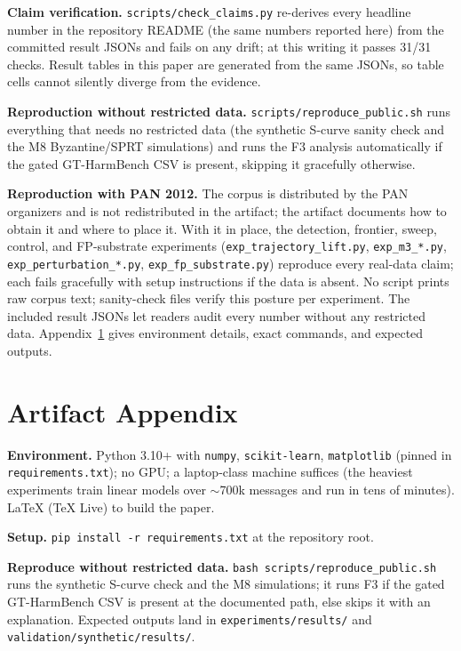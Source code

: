 \documentclass[letterpaper,twocolumn,10pt]{article}
\begin{document}
\textbf{Claim verification.} \texttt{scripts/check\_claims.py} re-derives
every headline number in the repository README (the same numbers reported
here) from the committed result JSONs and fails on any drift; at this
writing it passes 31/31 checks. Result tables in this paper are generated
from the same JSONs, so table cells cannot silently diverge from the
evidence.

\textbf{Reproduction without restricted data.}
\texttt{scripts/reproduce\_public.sh} runs everything that needs no
restricted data (the synthetic S-curve sanity check and the M8
Byzantine/SPRT simulations) and runs the F3 analysis automatically if the
gated GT-HarmBench CSV is present, skipping it gracefully otherwise.

\textbf{Reproduction with PAN 2012.} The corpus is distributed by the PAN
organizers and is not redistributed in the artifact; the artifact documents
how to obtain it and where to place it. With it in place, the detection,
frontier, sweep, control, and FP-substrate experiments
(\texttt{exp\_trajectory\_lift.py}, \texttt{exp\_m3\_*.py},
\texttt{exp\_perturbation\_*.py}, \texttt{exp\_fp\_substrate.py}) reproduce
every real-data claim; each fails gracefully with setup instructions if the
data is absent. No script prints raw corpus text; sanity-check files verify
this posture per experiment. The included result JSONs let readers audit
every number without any restricted data. Appendix~\ref{app:artifact} gives
environment details, exact commands, and expected outputs.




\appendix
\section{Artifact Appendix}
\label{app:artifact}

\textbf{Environment.} Python 3.10+ with \texttt{numpy},
\texttt{scikit-learn}, \texttt{matplotlib} (pinned in
\texttt{requirements.txt}); no GPU; a laptop-class machine suffices (the
heaviest experiments train linear models over $\sim$700k messages and run in
tens of minutes). LaTeX (TeX Live) to build the paper.

\textbf{Setup.} \texttt{pip install -r requirements.txt} at the repository
root.

\textbf{Reproduce without restricted data.}
\texttt{bash scripts/reproduce\_public.sh} runs the synthetic S-curve
check and the M8 simulations; it runs F3 if the gated GT-HarmBench CSV is
present at the documented path, else skips it with an explanation. Expected
outputs land in \texttt{experiments/results/} and
\texttt{validation/synthetic/results/}.
\end{document}
